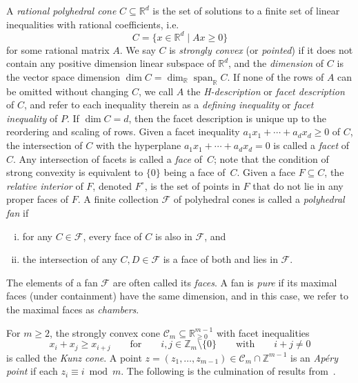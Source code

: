 \documentclass[ALCO, Unicode]{cedram}
\newcommand\ZZ{\mathbb{Z}}
\newcommand\RR{\mathbb{R}}
\newcommand\cC{{\mathcal C}}
\DeclareMathOperator\Span{span}
\begin{document}
A \emph{rational polyhedral cone} $C \subseteq \RR^d$ is the set of solutions to a finite set of linear inequalities with rational coefficients, i.e.
\[
C = \{x \in \RR^d \mid Ax \ge 0\}
\]
for some rational matrix $A$.  We say $C$ is \emph{strongly convex} (or \emph{pointed}) if it does not contain any positive dimension linear subspace of $\RR^d$, and the \emph{dimension} of $C$ is the vector space dimension $\dim C = \dim_\RR \Span_{\RR}C$. If none of the rows of $A$ can be omitted without changing $C$, we call $A$ the \emph{H-description} or \emph{facet description} of $C$, and refer to each inequality therein as a \emph{defining inequality} or \emph{facet inequality} of $P$.  If $\dim C = d$, then the facet description is unique up to the reordering and scaling of rows.  
Given a facet inequality $a_1x_1 + \cdots + a_dx_d \geq 0$ of $C$, the intersection of $C$ with the hyperplane $a_1x_1 + \cdots + a_dx_d = 0$ is called a \emph{facet} of $C$. Any intersection of facets is called a \emph{face} of~$C$; note that the condition of strong convexity is equivalent to $\{0\}$ being a face of~$C$. Given a face $F \subseteq C$, the \emph{relative interior} of $F$, denoted $F^{\circ}$, is the set of points in $F$ that do not lie in any proper faces of $F$.
A finite collection $\mathcal F$ of polyhedral cones is called a \emph{polyhedral fan} if 
\begin{enumerate}[(i)]
\item 
for any $C \in \mathcal{F}$, every face of $C$ is also in $\mathcal{F}$, and

\item 
the intersection of any $C,D \in \mathcal{F}$ is a face of both and lies in $\mathcal F$.

\end{enumerate}
The elements of a fan $\mathcal F$ are often called its \emph{faces}.  
A fan is \emph{pure} if its maximal faces (under containment) have the same dimension, and in this case, we refer to the maximal faces as \emph{chambers}.  

For $m \geq 2$, the strongly convex cone $\cC_m \subseteq \RR^{m-1}_{\geq 0}$ with facet inequalities
\[
x_i + x_j \geq x_{i+j}
\qquad \text{for} \qquad
i,j \in \ZZ_m \setminus \{0\}
\qquad \text{with} \qquad
i + j \ne 0
\]
is called the \emph{Kunz cone}.  
A point $z = (z_1, \ldots, z_{m-1}) \in \cC_{m} \cap \ZZ^{m-1}$ is an \emph{Ap\'ery point} if each $z_i \equiv i \bmod m$.  
The following is the culmination of results from~\cite{kunzfaces3,kunzfaces1,kunz}.  
\end{document}
